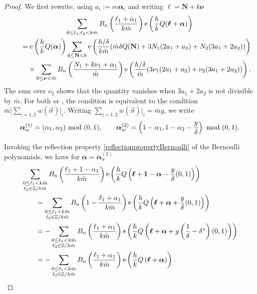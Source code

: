 \documentclass[pdftex]{sigma}
\newcommand{\ZZ}{\mathbb{Z}}
\def\bal{\boldsymbol{\alpha}}
\def\bol{\boldsymbol{\ell}}
\def\ex{{\rm e}}
\theoremstyle{definition}
\numberwithin{equation}{section}
\begin{document}
\begin{proof}
	We first rewrite, using $a_{i}:=m \bal_{i}$ and writing $\bol= \mathbf{N}+k\boldsymbol{\nu}$
	\begin{gather*}
		\sum_{0\leq \ell_1,\ell_2 < k\bar m}B_n\left( \frac{\ell_{1}+\alpha_{1}}{k\bar{m}} \right)\ex\left({\frac{h}{k}Q( \bol+\bal )}\right) \\
	\qquad	 =\ex\left(\frac{h}{k}Q( \bal )\right)\sum_{0\leq \mathbf{N}<k}
	\ex\left(\frac{{h/\delta}}{k\bar m}( \bar{m}\delta Q( \mathbf{N} )+3N_{1}( 2a_{1}+a_{2} )+N_{2}( 3a_{1}+2a_{2} ) )\right)
	\\
\phantom{\qquad	 =}{}	\times \sum_{0\leq \boldsymbol{\nu}<\bar{m}}B_{n}\left( \frac{N_{1}+k\nu_{1}+\alpha_{1}}{\bar{m}} \right)\ex\left(\frac{{h/\delta}}{\bar{m}}( 3\nu_{1}( 2a_{1}+a_{2} )+\nu_{2}( 3a_{1}+2a_{2} ) ) \right) .
\end{gather*}
The sum over $\nu_2$ shows that the quantity vanishes when $3a_{1}+2a_{2}$ is not divisible by $\bar m$. For both \smash{$\bal = \bal^{(1)}_w$} or \smash{$\bal = \bal^{(2)}_w$}, the condition is equivalent to the condition $\bar m\lvert \sum_{i=1,2} w(\vec \sigma)\lvert_i$. Writing $ \sum_{i=1,2} w(\vec \sigma)\lvert_i =\bar m y$, we write
	\begin{gather*}
	\bal_w^{(1)} = (\alpha_1,\alpha_2)~{\rm mod}~(0,1),\qquad
	\bal_w^{(2)} = \left(1-\alpha_1,1-\alpha_2-{\frac{y}{\delta}}\right)~{\rm mod}~(0,1).
\end{gather*}
	
Invoking the reflection property \eqref{reflectionpropertyBernoulli} of the Bernoulli polynomials, we have for $\bal = \bal_w^{(2)}$
	\begin{align*}
	& \sum_{\substack{0\leq \ell_1< k\bar m\\\ell_2\in \ZZ/k\bar m}} B_n\left( \frac{\ell_{1}+1-\alpha_{1}}{k\bar{m}} \right)
	\ex\left({\frac{h}{k}Q\left( \bol+{\bf 1}-\bal -\frac{y}{\delta}(0,1)\right)}\right)
	\\
 &\qquad =
	\sum_{\substack{0\leq \ell_1< k\bar m\\\ell_2\in \ZZ/k\bar m}}B_n\left(1- \frac{\ell_{1}+\alpha_{1}}{k\bar{m}} \right)\ex\left({\frac{h}{k}Q\left( \bol+\bal +\frac{y}{\delta}(0,1) \right)}\right) \\
 &\qquad= 	- \sum_{\substack{0\leq \ell_1< k\bar m\\\ell_2\in \ZZ/k\bar m}}B_n\left( \frac{\ell_{1}+\alpha_{1}}{k\bar{m}} \right)\ex\left({\frac{h}{k}Q\left( \bol+\bal +{y}\left(\frac{1}{\delta}-\delta^\ast\right)(0,1) \right)}\right) \\
 &\qquad	= - \sum_{\substack{0\leq \ell_1< k\bar m\\\ell_2\in \ZZ/k\bar m}}B_n\left( \frac{\ell_{1}+\alpha_{1}}{k\bar{m}} \right)\ex\left({\frac{h}{k}Q\left( \bol+\bal \right)}\right).
	\end{align*}
	

\end{proof}
\end{document}
